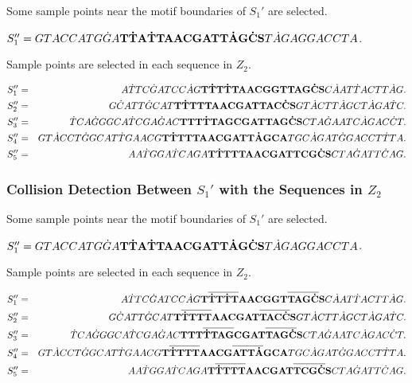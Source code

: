 \documentclass[11pt]{article}
\begin{document}
Some sample points near the motif boundaries of $S_1'$ are selected.

 $S_1''=GTACCATG\dot{G}A{\Large\bf T\dot{T}A\dot{T}T
AACGATT\dot{A}G\dot{C}S}T\dot{A}GAGGACCTA$.

Sample points are selected in each sequence in $Z_2$.

\begin{eqnarray*}
S_1''&=&A\dot{T}TC\dot{G}ATCC\dot{A}G{\Large\bf
T\dot{T}T\dot{T}TAACGGTTAG\dot{C}S}C\dot{A}AT\dot{T}ACTT\dot{A}G.\\
S_2''&=&G\dot{C}ATT\dot{G}CAT{\Large\bf
T\dot{T}TTTAACGATTAC\dot{C}S}GT\dot{A}CTT\dot{A}GCT\dot{A}GA\dot{T}C.\\
S_3''&=&\dot{T}CA\dot{G}GGCA\dot{T}CGA\dot{G}AC{\Large\bf TTT\dot{T}TAGCGATTAG\dot{C}S}CTA\dot{G}AATC\dot{A}GAC\dot{C}T.\\
S_4''&=&GT\dot{A}CCT\dot{G}GCAT\dot{T}GAACG{\Large\bf T\dot{T}TTTAACGATT\dot{A}GCA}TGC\dot{A}GAT\dot{G}GACCT\dot{T}TA.\\
S_5''&=&AA\dot{T}GGA\dot{T}CAGA{\Large\bf
T\dot{T}TTTAACGATTCG\dot{C}S}CTA\dot{G}ATT\dot{C}AG.
\end{eqnarray*}


\subsubsection{Collision Detection Between $S_1'$ with the Sequences in $Z_2$}

Some sample points near the motif boundaries of $S_1'$ are selected.

 $S_1''=GTACCATG\dot{G}A{\Large\bf T\dot{T}A\dot{T}T
AACGATT\dot{A}G\dot{C}S}T\dot{A}GAGGACCTA$.

Sample points are selected in each sequence in $Z_2$.

\begin{eqnarray*}
S_1''&=&A\dot{T}TC\dot{G}ATCC\dot{A}G{\Large\bf
T\overline{\dot{T}T\dot{T}T}AACGGT\overline{TAG\dot{C}}S}C\dot{A}AT\dot{T}ACTT\dot{A}G.\\
S_2''&=&G\dot{C}ATT\dot{G}CAT{\Large\bf
T\overline{\dot{T}TTT}AACGAT\overline{TAC\dot{C}}S}GT\dot{A}CTT\dot{A}GCT\dot{A}GA\dot{T}C.\\
S_3''&=&\dot{T}CA\dot{G}GGCA\dot{T}CGA\dot{G}AC{\Large\bf TTT\overline{\dot{T}TAG}CGAT\overline{TAG\dot{C}}S}CTA\dot{G}AATC\dot{A}GAC\dot{C}T.\\
S_4''&=&GT\dot{A}CCT\dot{G}GCAT\dot{T}GAACG{\Large\bf T\overline{\dot{T}TTT}AACG\overline{ATT\dot{A}}GCA}TGC\dot{A}GAT\dot{G}GACCT\dot{T}TA.\\
S_5''&=&AA\dot{T}GGA\dot{T}CAGA{\Large\bf
T\overline{\dot{T}TTT}AACGAT\overline{TCG\dot{C}}S}CTA\dot{G}ATT\dot{C}AG.
\end{eqnarray*}
\end{document}
